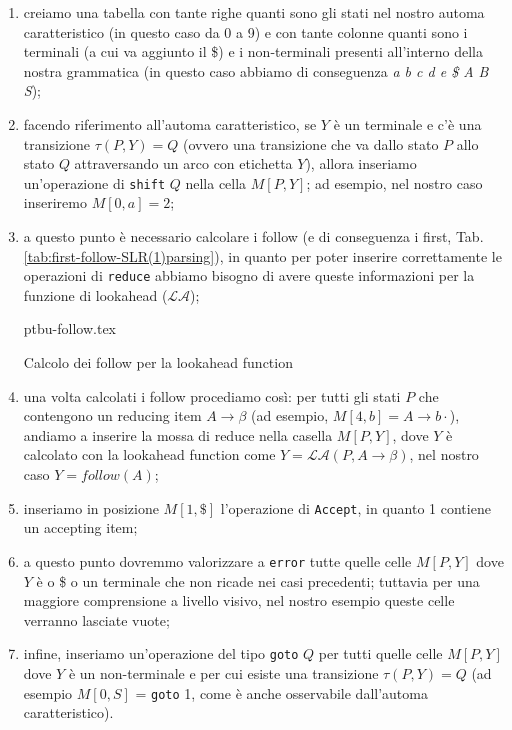 \documentclass[class=book, crop=false, oneside, 12pt]{standalone}
\begin{document}
\begin{enumerate}
    \item creiamo una tabella con tante righe quanti sono gli stati nel nostro automa caratteristico (in questo caso da 0 a 9) e con tante colonne quanti sono i terminali (a cui va aggiunto il \$) e i non-terminali presenti all'interno della nostra grammatica (in questo caso abbiamo di conseguenza \emph{a b c d e \$ A B S});
    \item facendo riferimento all'automa caratteristico, se \(Y\) è un terminale e c'è una transizione \(\tau (P, Y) = Q\) (ovvero una transizione che va dallo stato \(P\) allo stato \(Q\) attraversando un arco con etichetta \(Y\)), allora inseriamo un'operazione di \texttt{shift} \(Q\) nella cella \(M[P, Y]\); ad esempio, nel nostro caso inseriremo \(M[0, a] = 2\);
    \item a questo punto è necessario calcolare i follow (e di conseguenza i first, Tab.\ref{tab:first-follow-SLR(1)parsing}), in quanto per poter inserire correttamente le operazioni di \texttt{reduce} abbiamo bisogno di avere queste informazioni per la funzione di lookahead (\(\mathcal{LA}\));
    \begin{table}[H]
        \centering
        {ptbu-follow.tex}
        \caption{Calcolo dei follow per la lookahead function}
        \label{tab:first-follow-SLR(1)parsing}
    \end{table}
    \item una volta calcolati i follow procediamo così: per tutti gli stati \(P\) che contengono un reducing item \(A \to \beta\) (ad esempio, \(M[4, b] = A \rightarrow b\cdot\)), andiamo a inserire la mossa di reduce nella casella \(M[P, Y]\), dove \(Y\) è calcolato con la lookahead function come \(Y = \mathcal{LA}(P, A \to \beta)\), nel nostro caso \(Y = follow(A)\); 
    \item inseriamo in posizione \(M[1, \$]\) l'operazione di \texttt{Accept}, in quanto 1 contiene un accepting item;
    \item a questo punto dovremmo valorizzare a \texttt{error} tutte quelle celle \(M[P, Y]\) dove \(Y\) è o \$ o un terminale che non ricade nei casi precedenti; tuttavia per una maggiore comprensione a livello visivo, nel nostro esempio queste celle verranno lasciate vuote;
    \item infine, inseriamo un'operazione del tipo \texttt{goto} \(Q\) per tutti quelle celle \(M[P, Y]\) dove \(Y\) è un non-terminale e per cui esiste una transizione \(\tau(P, Y) = Q\) (ad esempio \(M[0, S]\) = \texttt{goto} 1, come è anche osservabile dall'automa caratteristico).
\end{enumerate}
\end{document}
